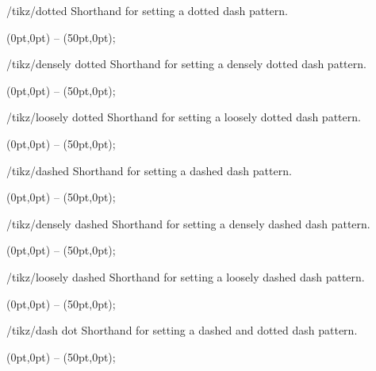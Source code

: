\begin{stylekey}{/tikz/dotted}
    Shorthand for setting a dotted dash pattern.
\begin{codeexample}[]
\tikz \draw[dotted] (0pt,0pt) -- (50pt,0pt);
\end{codeexample}
\end{stylekey}

\begin{stylekey}{/tikz/densely dotted}
    Shorthand for setting a densely dotted dash pattern.
\begin{codeexample}[]
\tikz {} (0pt,0pt) -- (50pt,0pt);
\end{codeexample}
\end{stylekey}

\begin{stylekey}{/tikz/loosely dotted}
    Shorthand for setting a loosely dotted dash pattern.
\begin{codeexample}[]
\tikz {} (0pt,0pt) -- (50pt,0pt);
\end{codeexample}
\end{stylekey}

\begin{stylekey}{/tikz/dashed}
    Shorthand for setting a dashed dash pattern.
\begin{codeexample}[]
\tikz \draw[dashed] (0pt,0pt) -- (50pt,0pt);
\end{codeexample}
\end{stylekey}

\begin{stylekey}{/tikz/densely dashed}
    Shorthand for setting a densely dashed dash pattern.
\begin{codeexample}[]
\tikz {} (0pt,0pt) -- (50pt,0pt);
\end{codeexample}
\end{stylekey}

\begin{stylekey}{/tikz/loosely dashed}
    Shorthand for setting a loosely dashed dash pattern.
\begin{codeexample}[]
\tikz {} (0pt,0pt) -- (50pt,0pt);
\end{codeexample}
\end{stylekey}

\begin{stylekey}{/tikz/dash dot}
    Shorthand for setting a dashed and dotted dash pattern.
\begin{codeexample}[]
\tikz {} (0pt,0pt) -- (50pt,0pt);
\end{codeexample}
\end{stylekey}


